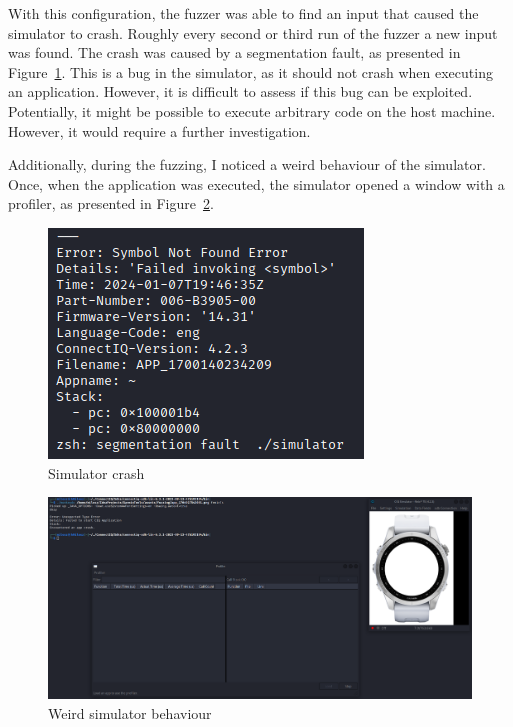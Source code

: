 With this configuration, the fuzzer was able to find an input that caused the simulator to crash.
Roughly every second or third run of the fuzzer a new input was found.
The crash was caused by a segmentation fault, as presented in Figure~\ref{fig:simulator-crash}.
This is a bug in the simulator, as it should not crash when executing an application.
However, it is difficult to assess if this bug can be exploited.
Potentially, it might be possible to execute arbitrary code on the host machine.
However, it would require a further investigation.

Additionally, during the fuzzing, I noticed a weird behaviour of the simulator.
Once, when the application was executed, the simulator opened a window with a profiler, as presented in Figure~\ref{fig:simulator-bug-profiler}.



\begin{figure}[h]
    \centering
    \includegraphics[width=0.4\linewidth]{../../images/simulator-crash}
    \caption{Simulator crash}
    \label{fig:simulator-crash}
\end{figure}

\begin{figure}[h]
    \centering
    \includegraphics[width=1\linewidth]{../../images/simulator-bug-profiler}
    \caption{Weird simulator behaviour}
    \label{fig:simulator-bug-profiler}
\end{figure}
